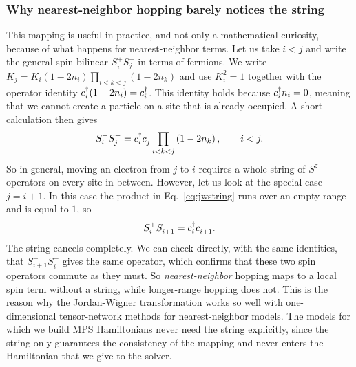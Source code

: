 \documentclass[lecture_notes.tex]{subfiles}
\begin{document}
\subsubsection{Why nearest-neighbor hopping barely notices the string}
\label{sec:nnhop}
This mapping is useful in practice, and not only a mathematical curiosity, because of what happens
for nearest-neighbor terms. Let us take $i<j$ and write the general spin bilinear $S_i^+S_j^-$ in
terms of fermions. We write $K_j = K_i(1-2n_i)\prod_{i<k<j}(1-2n_k)$ and use $K_i^2=1$ together
with the operator identity $c^{\dagger}_{i}(1-2n_i)=c^{\dagger}_{i}$. This identity holds because $c^{\dagger}_{i}n_i=0$,
meaning that we cannot create a particle on a site that is already occupied. A short calculation
then gives
\begin{equation}
  S_i^+S_j^- = \cre{i}\ann{j}\prod_{i<k<j}\left(1-2n_k\right), \qquad i<j.
  \label{eq:jwstring}
\end{equation}
So in general, moving an electron from $j$ to $i$ requires a whole string of $S^z$ operators on
every site in between. However, let us look at the special case $j=i+1$. In this case the product
in Eq.~\eqref{eq:jwstring} runs over an empty range and is equal to $1$, so
\begin{equation}
  S_i^+S_{i+1}^- = \cre{i}\ann{i+1}.
\end{equation}
The string cancels completely. We can check directly, with the same identities, that
$S_{i+1}^-S_i^+$ gives the same operator, which confirms that these two spin operators commute as
they must. So \emph{nearest-neighbor} hopping maps to a local spin term without a string, while
longer-range hopping does not. This is the reason why the Jordan-Wigner transformation works so
well with one-dimensional tensor-network methods for nearest-neighbor models. The models for which
we build MPS Hamiltonians never need the string explicitly, since the string only guarantees the
consistency of the mapping and never enters the Hamiltonian that we give to the solver.
\end{document}
